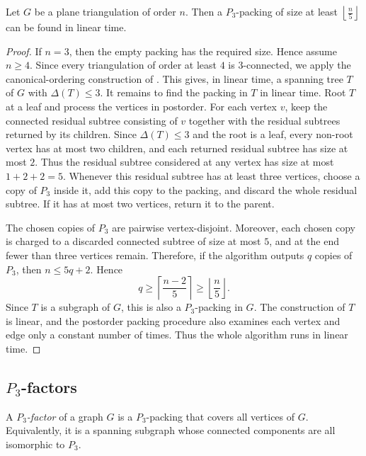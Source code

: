 \documentclass{patmorin}
\newcommand{\defin}[1]{\emph{\textcolor{brightmaroon}{#1}}}
\begin{document}
\begin{thm}\label{cor:p3-packing-linear}
Let $G$ be a plane triangulation of order $n$. Then a $P_3$-packing of size at least $\left\lfloor \frac n5\right\rfloor$ can be found in linear time.
\end{thm}

\begin{proof}
If $n=3$, then the empty packing has the required size. Hence assume
$n\ge 4$. 
Since every triangulation of order at least $4$ is
$3$-connected, we  apply the canonical-ordering construction of
\cite[Theorem~1]{Biedl2013}. This gives, in linear time, a spanning tree
$T$ of $G$ with $\Delta(T)\le 3$.
It remains to find the packing in $T$ in linear time. Root $T$ at a leaf and process the vertices in postorder. 
For each vertex $v$, keep the connected residual subtree consisting of $v$ together with the residual subtrees returned by its children. 
Since $\Delta(T)\le 3$ and the root is a leaf, every
non-root vertex has at most two children, and each returned residual subtree has size at most $2$. Thus the residual subtree considered at any vertex has size at most $1+2+2=5$.
Whenever this residual subtree has at least three vertices, choose a copy of $P_3$ inside it, add this copy to the packing, and discard the whole residual subtree. If it has at most two vertices, return it to the parent.

The chosen copies of $P_3$ are pairwise vertex-disjoint. Moreover, each chosen
copy is charged to a discarded connected subtree of size at most $5$, and at the end fewer than three vertices remain. Therefore, if the algorithm outputs $q$ copies of $P_3$, then $n\le 5q+2$.
Hence
\[
q\ge \left\lceil \frac{n-2}{5}\right\rceil
\ge
\left\lfloor \frac n5\right\rfloor .
\]
Since $T$ is a subgraph of $G$, this is also a $P_3$-packing in $G$.
The construction of $T$ is linear, and the postorder packing procedure also examines each vertex and edge only a constant number of times. 
Thus the whole algorithm runs in linear time.
\end{proof}
\subsection{\texorpdfstring{$P_3$-factors}{P3-factors}}

A \defin{$P_3$-factor} of a graph $G$ is a $P_3$-packing that covers all
vertices of $G$. Equivalently, it is a spanning subgraph whose connected
components are all isomorphic to $P_3$.
\end{document}
